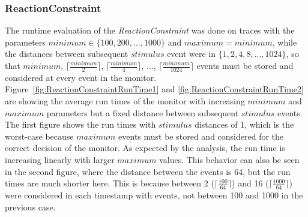 \subsubsection{ReactionConstraint}
The runtime evaluation of the \textit{ReactionConstraint} was done on traces with the parameters $minimum\in\{100,200,...,1000\}$ and $maximum = minimum$, while the distances between subsequent $stimulus$ event were in $\{1, 2, 4, 8, ..., 1024\}$, so that $minimum$, $\lceil\frac{minimum}{2}\rceil$,  $\lceil\frac{minimum}{4}\rceil$, ...,  $\lceil\frac{minimum}{1024}\rceil$ events must be stored and considered at every event in the monitor.\\
Figure~\ref{fig:ReactionConstraintRunTime1} and \ref{fig:ReactionConstraintRunTime2} are showing the average run times of the monitor with increasing $minimum$ and $maximum$ parameters but a fixed distance between subsequent $stimulus$ events. The first figure shows the run times with $stimulus$ distances of 1, which is the worst-case because $maximum$ events must be stored and considered for the correct decision of the monitor. As expected by the analysis, the run time is increasing linearly with larger $maximum$ values. This behavior can also be seen in the second figure, where the distance between the events is 64, but the run times are much shorter here. This is because between 2 ($\lceil \frac{100}{64}\rceil$) and 16 ($\lceil \frac{1000}{64}\rceil$) were considered in each timestamp with events, not between 100 and 1000 in the previous case.
